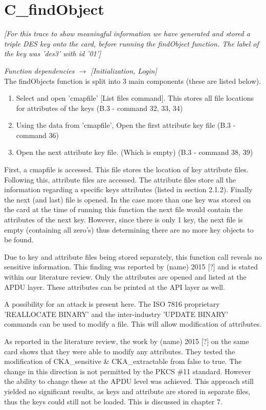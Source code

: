 \documentclass[bsc,frontabs,twoside,singlespacing,parskip,deptreport]{infthesis}     %
\begin{document}
\section{C\_findObject}
\textit{[For this trace to show meaningful information we have generated and stored a triple DES key onto the card, before running the findObject function. The label of the key was 'des3' with id '01']}

\textit{Function dependencies $\rightarrow$ [Initialization, Login]}\\


The findObjects function is split into 3 main components (these are listed below).

\begin{enumerate}
\item Select and open 'cmapfile' [List files command]. This stores all file locations for attributes of the keys (B.3 - command 32, 33, 34)
\item Using the data from 'cmapfile', Open the first attribute key file (B.3 - command 36)
\item Open the next attribute key file. (Which is empty) (B.3 - command 38, 39)\\
\end{enumerate}


First, a cmapfile is accessed. This file stores the location of key attribute files. Following this, attribute files are accessed. The attribute files store all the information regarding a specific keys attributes (listed in section 2.1.2). Finally the next (and last) file is opened. In the case more than one key was stored on the card at the time of running this function the next file would contain the attributes of the next key. However, since there is only 1 key, the next file is empty (containing all zero's) thus determining there are no more key objects to be found.

Due to key and attribute files being stored separately, this function call reveals no sensitive information. This finding was reported by (name) 2015 [?] and is stated within our literature review. Only the attributes are opened and listed at the APDU layer. These attributes can be printed at the API layer as well.

A possibility for an attack is present here. The ISO 7816 proprietary 'REALLOCATE BINARY' and the inter-industry 'UPDATE BINARY' commands can be used to modify a file. This will allow modification of attributes. 

As reported in the literature review, the work by (name) 2015 [?] on the same card shows that they were able to modify any attributes. They tested the modification of CKA\_sensitive \& CKA\_extractable from false to true. The change in this direction is not permitted by the PKCS \#11 standard. However the ability to change these at the APDU level was achieved. This approach still yielded no significant results, as keys and attribute are stored in separate files, thus the keys could still not be loaded. This is discussed in chapter 7.
\end{document}
